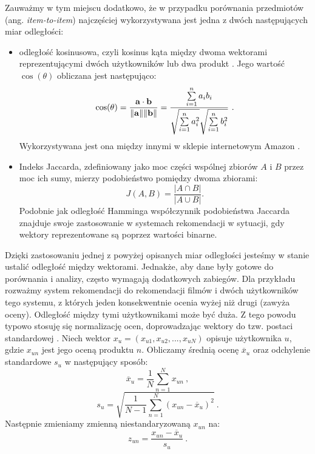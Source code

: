 Zauważmy w tym miejscu dodatkowo, że w przypadku porównania przedmiotów (ang. \textit{item-to-item}) najczęściej wykorzystywana jest jedna z dwóch następujących miar odległości:
\begin{itemize}
    \item odległość kosinusowa, czyli kosinus kąta między dwoma wektorami reprezentującymi dwóch użytkowników lub dwa produkt \cite{Eksploracjatekstu}. Jego wartość $\cos(\theta)$ obliczana jest następująco:
    \begin{equation}
        \cos(\theta) = {\mathbf{a} \cdot \mathbf{b} \over \|\mathbf{a}\| \|\mathbf{b}\|} = \frac{ \sum\limits_{i=1}^{n}{a_i  b_i} }{ \sqrt{\sum\limits_{i=1}^{n}{a_i^2}}  \sqrt{\sum\limits_{i=1}^{n}{b_i^2}} }~.
    \end{equation}
    Wykorzystywana jest ona między innymi w sklepie internetowym Amazon \cite{Amazon.comRecommendationsItem-to-ItemCollaborativeFiltering}.
    \item Indeks Jaccarda, zdefiniowany jako moc części wspólnej zbiorów $A$ i $B$ przez moc ich sumy, mierzy podobieństwo pomiędzy dwoma zbiorami:
    \begin{equation}
       J (A,B) = \frac{|A \cap B|}{|A \cup B|}.
    \end{equation}
    Podobnie jak odległość Hamminga współczynnik podobieństwa Jaccarda znajduje swoje zastosowanie w systemach rekomendacji w sytuacji, gdy wektory reprezentowane są poprzez wartości binarne.
\end{itemize}

Dzięki zastosowaniu jednej z powyżej opisanych miar odległości jesteśmy w stanie ustalić odległość między wektorami. Jednakże, aby dane były gotowe do porównania i analizy, często wymagają dodatkowych zabiegów. Dla przykładu rozważmy system rekomendacji do rekomendacji filmów i dwóch użytkowników tego systemu, z których jeden konsekwentnie ocenia wyżej niż drugi (zawyża oceny). Odległość między tymi użytkownikami może być duża. Z tego powodu 
typowo stosuję się normalizację ocen, doprowadzając wektory do tzw. postaci standardowej \cite{Similarityandrecommendersystems}.
Niech wektor $x_u = (x_{u1}, x_{u2}, ... , x_{uN})$ opisuje użytkownika $u$, gdzie $x_{un}$ jest jego oceną produktu $n$. Obliczamy średnią ocenę $\overline{x}_{u}$ oraz odchylenie standardowe $s_{u}$ w następujący sposób:
\begin{equation}
\label{eqn:normalizacja1}
     \overline{x}_{u} = \frac{1}{N}\sum_{n=1}^N x_{un}~,
\end{equation}
\begin{equation}
\label{eqn:normalizacja2}
    s_{u} = \sqrt{\frac{1}{N-1} \sum_{n=1}^N(x_{un} - \overline{x}_{u})^2}~.
\end{equation}
Następnie zmieniamy zmienną niestandaryzowaną $x_{un}$ na:
\begin{equation}
\label{eqn:normalizacja3}
    z_{un}= \frac{x_{un}-\overline{x}_{u}}{s_{u}}~.
\end{equation}

